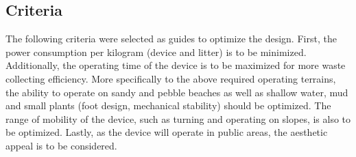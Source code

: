 \subsection{Criteria}

The following criteria were selected as guides to optimize the design. First, the power consumption per kilogram (device and litter) is to be minimized. Additionally, the operating time of the device is to be maximized for more waste collecting efficiency. 
More specifically to the above required operating terrains, the ability to operate on sandy and pebble beaches as well as shallow water, mud and small plants (foot design, mechanical stability) should be optimized. The range of mobility of the device, such as turning and operating on slopes, is also to be optimized.
Lastly, as the device will operate in public areas, the aesthetic appeal is to be considered.
